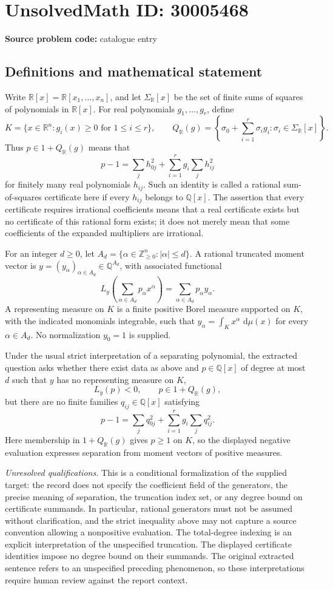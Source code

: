 \documentclass[11pt]{article}
\newcommand{\Z}{\mathbb{Z}}
\newcommand{\Q}{\mathbb{Q}}
\newcommand{\R}{\mathbb{R}}
\newcommand{\dd}{\,\mathrm{d}}
\begin{document}
\section*{UnsolvedMath ID: 30005468}
\textbf{Source problem code:} catalogue entry
\subsection{Definitions and mathematical statement}
Write \(\R[x]=\R[x_1,\ldots,x_n]\), and let \(\Sigma_{\R}[x]\) be the set of finite sums of squares of polynomials in \(\R[x]\). For real polynomials \(g_1,\ldots,g_r\), define
\[
K=\{x\in\R^n:g_i(x)\geq0\text{ for }1\leq i\leq r\},\qquad
Q_{\R}(g)=\left\{\sigma_0+\sum_{i=1}^r\sigma_i g_i:\sigma_i\in\Sigma_{\R}[x]\right\}.
\]
Thus \(p\in1+Q_{\R}(g)\) means that
\[
p-1=\sum_j h_{0j}^2+\sum_{i=1}^r g_i\sum_j h_{ij}^2
\]
for finitely many real polynomials \(h_{ij}\). Such an identity is called a rational sum-of-squares certificate here if every \(h_{ij}\) belongs to \(\Q[x]\). The assertion that every certificate requires irrational coefficients means that a real certificate exists but no certificate of this rational form exists; it does not merely mean that some coefficients of the expanded multipliers are irrational.

For an integer \(d\geq0\), let \(A_d=\{\alpha\in\Z_{\geq0}^n:|\alpha|\leq d\}\). A rational truncated moment vector is \(y=(y_\alpha)_{\alpha\in A_d}\in\Q^{A_d}\), with associated functional
\[
L_y\!\left(\sum_{\alpha\in A_d}p_\alpha x^\alpha\right)=\sum_{\alpha\in A_d}p_\alpha y_\alpha.
\]
A representing measure on \(K\) is a finite positive Borel measure supported on \(K\), with the indicated monomials integrable, such that \(y_\alpha=\int_K x^\alpha\,\dd\mu(x)\) for every \(\alpha\in A_d\). No normalization \(y_0=1\) is supplied.

Under the usual strict interpretation of a separating polynomial, the extracted question asks whether there exist data as above and \(p\in\Q[x]\) of degree at most \(d\) such that \(y\) has no representing measure on \(K\),
\[
L_y(p)<0,\qquad p\in1+Q_{\R}(g),
\]
but there are no finite families \(q_{ij}\in\Q[x]\) satisfying
\[
p-1=\sum_j q_{0j}^2+\sum_{i=1}^r g_i\sum_j q_{ij}^2.
\]
Here membership in \(1+Q_{\R}(g)\) gives \(p\geq1\) on \(K\), so the displayed negative evaluation expresses separation from moment vectors of positive measures.

\emph{Unresolved qualifications.} This is a conditional formalization of the supplied target: the record does not specify the coefficient field of the generators, the precise meaning of separation, the truncation index set, or any degree bound on certificate summands. In particular, rational generators must not be assumed without clarification, and the strict inequality above may not capture a source convention allowing a nonpositive evaluation. The total-degree indexing is an explicit interpretation of the unspecified truncation. The displayed certificate identities impose no degree bound on their summands. The original extracted sentence refers to an unspecified preceding phenomenon, so these interpretations require human review against the report context.
\end{document}
